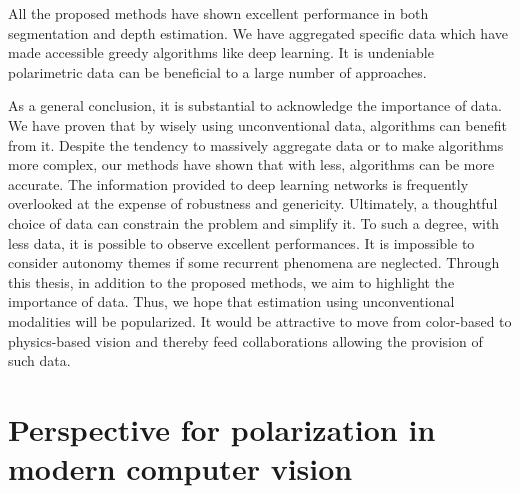 All the proposed methods have shown excellent performance in both segmentation and depth estimation. We have aggregated specific data which have made accessible greedy algorithms like deep learning. It is undeniable polarimetric data can be beneficial to a large number of approaches.


As a general conclusion, it is substantial to acknowledge the importance of data. We have proven that by wisely using unconventional data, algorithms can benefit from it. Despite the tendency to massively aggregate data or to make algorithms more complex, our methods have shown that with less, algorithms can be more accurate. The information provided to deep learning networks is frequently overlooked at the expense of robustness and genericity. Ultimately, a thoughtful choice of data can constrain the problem and simplify it. To such a degree, with less data, it is possible to observe excellent performances. 
It is impossible to consider autonomy themes if some recurrent phenomena are neglected. Through this thesis, in addition to the proposed methods, we aim to highlight the importance of data. Thus, we hope that estimation using unconventional modalities will be popularized. It would be attractive to move from color-based to physics-based vision and thereby feed collaborations allowing the provision of such data.


\section{Perspective for polarization in modern computer vision}\label{polaper}

